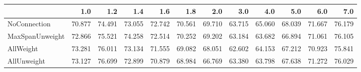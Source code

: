 \begin{tabular}{lrrrrrrrrrrr}
\toprule
{} &    1.0 &    1.2 &    1.4 &    1.6 &    1.8 &    2.0 &    3.0 &    4.0 &    5.0 &    6.0 &    7.0 \\
\midrule
NoConnection    & 70.877 & 74.491 & 73.055 & 72.742 & 70.561 & 69.710 & 63.715 & 65.060 & 68.039 & 71.667 & 76.179 \\
MaxSpanUnweight & 72.866 & 75.521 & 74.258 & 72.514 & 70.252 & 69.202 & 63.184 & 63.682 & 66.894 & 71.061 & 76.105 \\
AllWeight       & 73.281 & 76.011 & 73.134 & 71.555 & 69.082 & 68.051 & 62.602 & 64.153 & 67.212 & 70.923 & 75.841 \\
AllUnweight     & 73.127 & 76.699 & 72.899 & 70.879 & 68.984 & 66.769 & 63.380 & 63.798 & 67.638 & 71.272 & 76.029 \\
\bottomrule
\end{tabular}
